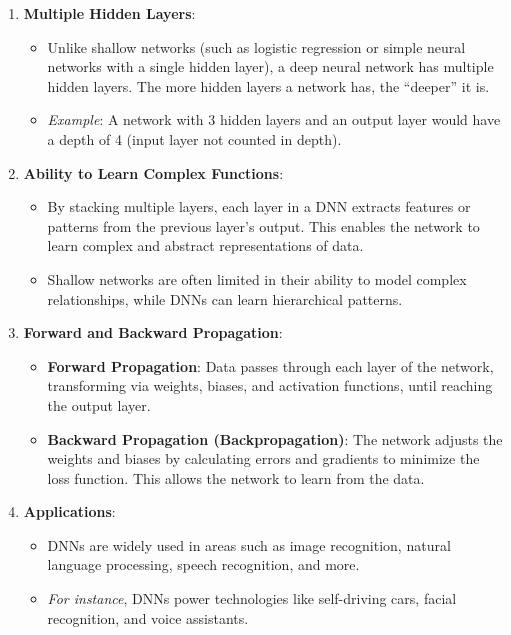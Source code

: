 \documentclass[letterpaper,12pt,notitlepage,twoside]{report}
\begin{document}
\begin{enumerate}
    \item \textbf{Multiple Hidden Layers}:
    \begin{itemize}
        \item Unlike shallow networks (such as logistic regression or simple neural networks with a single hidden layer), a deep neural network has multiple hidden layers. The more hidden layers a network has, the ``deeper'' it is.
        \item \textit{Example}: A network with 3 hidden layers and an output layer would have a depth of 4 (input layer not counted in depth).
    \end{itemize}

    \item \textbf{Ability to Learn Complex Functions}:
    \begin{itemize}
        \item By stacking multiple layers, each layer in a DNN extracts features or patterns from the previous layer's output. This enables the network to learn complex and abstract representations of data.
        \item Shallow networks are often limited in their ability to model complex relationships, while DNNs can learn hierarchical patterns.
    \end{itemize}

    \item \textbf{Forward and Backward Propagation}:
    \begin{itemize}
        \item \textbf{Forward Propagation}: Data passes through each layer of the network, transforming via weights, biases, and activation functions, until reaching the output layer.
        \item \textbf{Backward Propagation (Backpropagation)}: The network adjusts the weights and biases by calculating errors and gradients to minimize the loss function. This allows the network to learn from the data.
    \end{itemize}

    \item \textbf{Applications}:
    \begin{itemize}
        \item DNNs are widely used in areas such as image recognition, natural language processing, speech recognition, and more.
        \item \textit{For instance}, DNNs power technologies like self-driving cars, facial recognition, and voice assistants.
    \end{itemize}


\end{enumerate}
\end{document}
